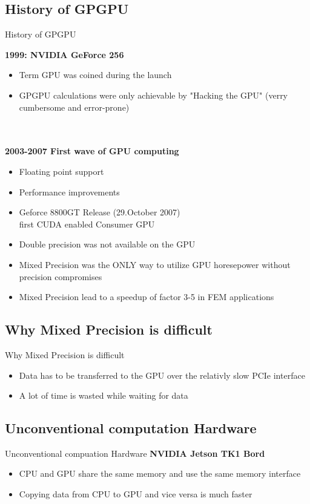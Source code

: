 \documentclass[10pt]{beamer}
\begin{document}
\subsection{History of GPGPU}
\begin{frame}{History of GPGPU}

	\textbf{1999: NVIDIA GeForce 256}\\
	\begin{itemize}
	\item Term GPU was coined during the launch
	\item GPGPU calculations were only achievable by "Hacking the GPU" 
			(verry cumbersome and error-prone)
	\end{itemize}
~\\~\\
\textbf{2003-2007 First wave of GPU computing}
\begin{itemize}
\item Floating point support
\item Performance improvements
\item Geforce 8800GT Release (29.October 2007)\\
	first CUDA enabled Consumer GPU
\item Double precision was not available on the GPU
\item Mixed Precision was the ONLY way to utilize GPU horesepower
	without precision compromises
\item Mixed Precision lead to a speedup of factor 3-5 in FEM applications %
\end{itemize}
\end{frame}

\subsection{Why Mixed Precision is difficult}
\begin{frame}{Why Mixed Precision is difficult}
\begin{itemize}
\item Data has to be transferred to the GPU over the relativly \color{red} slow PCIe \color{black} interface
\item A lot of time is wasted while waiting for data
\end{itemize}
\end{frame}

\subsection{Unconventional computation Hardware}
\begin{frame}{Unconventional compuation Hardware}
\textbf{NVIDIA Jetson TK1 Bord}
\begin{itemize}
\item CPU and GPU share the same memory and use the same memory interface
\item Copying data from CPU to GPU and vice versa is much faster
\end{itemize}
\end{frame}
\end{document}
